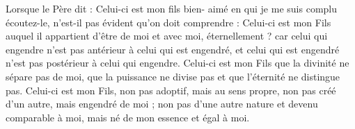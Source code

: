 Lorsque le Père dit : Celui-ci est mon fils bien- aimé en qui je me suis complu écoutez-le, n’est-il pas évident qu’on doit comprendre : Celui-ci est mon Fils auquel il appartient d’être de moi et avec moi, éternellement ? car celui qui engendre n’est pas antérieur à celui qui est engendré, et celui qui est engendré n’est pas postérieur à celui qui engendre. Celui-ci est mon Fils que la divinité ne sépare pas de moi, que la puissance ne divise pas et que l’éternité ne distingue pas. Celui-ci est mon Fils, non pas adoptif, mais au sens propre, non pas créé d’un autre, mais engendré de moi ; non pas d’une autre nature et devenu comparable à moi, mais né de mon essence et égal à moi.
